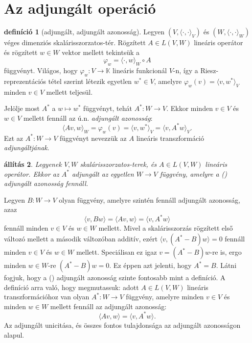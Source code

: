 \documentclass[9pt, a4paper, showtrims]{memoir}
\makeatletter
\renewenvironment{proof}[1][\proofname]
    {\par\pushQED{\qed}%
    \normalfont \topsep6\p@\@plus6\p@\relax
    \trivlist
    \item[\hskip\labelsep
        \itshape
    #1\@addpunct{:}]\ignorespaces}
    {\popQED\endtrivlist\@endpefalse}
\theoremstyle{plain}
\newtheorem{proposition}{állítás}[chapter]
\theoremstyle{remark}
\theoremstyle{definition}
\newtheorem{definition}[proposition]{definíció}
\newcommand{\ip}[2]{\langle#1,#2\rangle}
\makeatother
\begin{document}
\section{Az adjungált operáció}
\begin{definition}[adjungált, adjungált azonosság]
	Legyen $\left( V,\ip{\cdot}{\cdot}_V \right)$ és
	$\left( W,\ip{\cdot}{\cdot}_W \right)$ véges dimenziós ska\-láris\-szor\-zatos-tér.
	Rögzített $A\in L\left( V,W \right)$ lineáris operátor és rögzített $w\in W$ vektor mellett tekintsük a
	\[
		\varphi_w=
		\ip{\cdot}{w}_W\circ A
	\]
	függvényt.
	Világos, hogy $\varphi_w:V\to\mathbb{K}$ lineáris funkcionál $V$-n,
	így a Riesz-reprezentációs tétel szerint létezik egyetlen $w^\ast\in V$,
	amelyre
	$\varphi_w\left( v \right)=\ip{v}{w^\ast}_V$ minden $v\in V$ mellett teljesül.

	Jelölje most $A^\ast$ a $w\mapsto w^\ast$ függvényt, tehát
	$A^\ast:W\to V$.
	Ekkor minden $v\in V$ és $w\in V$ mellett fennáll az ú.n. \emph{adjungált azonosság}:
	\[
		\ip{Av}{w}_W
		=
		\varphi_w\left( v \right)
		=
		\ip{v}{w^\ast}_V
		=
		\ip{v}{A^\ast w}_V.\tag{\dag}
	\]
	Ezt az $A^\ast:W\to V$ függvényt nevezzük az $A$ lineáris transzformáció \emph{adjungáltjának}.
\end{definition}
\begin{proposition}
	Legyenek $V,W$ skalárisszorzatos-terek, és $A\in L\left( V,W \right)$ lineáris operátor.
	Ekkor az $A^\ast$ adjungált az egyetlen $W\to V$ függvény,
	amelyre a (\dag) adjungált azonosság fennáll.
\end{proposition}
\begin{proof}
	Legyen $B:W\to V$ olyan függvény, amelyre szintén fennáll adjungált azonosság,
	azaz
	\[
		\ip{v}{Bw}
		=
		\ip{Av}{w}
		=
		\ip{v}{A^\ast w}
	\]
	fennáll minden $v\in V$ és $w\in W$ mellett.
	Mivel a skalárisszorzás rögzített első változó mellett a második változóban additív,
	ezért
	$\ip{v}{\left( A^\ast-B \right)w}=0$ fennáll minden $v\in V$ és $w\in W$ mellett.
	Speciálisan ez igaz $v=\left( A^\ast-B \right)w$-re is, ergo minden $w\in W$-re
	$\left( A^\ast-B \right)w=0$.
	Ez éppen azt jelenti, hogy $A^\ast=B$.
\end{proof}
Látni fogjuk, hogy a (\dag) adjungált azonosság szinte fontosabb mint a definíció.
A definíció arra való, hogy megmutassuk: adott $A\in L\left( V,W \right)$ lineáris transzformációhoz van olyan
$A^\ast:W\to V$ függvény, amelyre minden $v\in V$ és minden $w\in W$ mellett fennáll az adjungált azonosság:
\[
	\ip{Av}{w}
	=
	\ip{v}{A^\ast w}.
	\tag{\dag}
\]
Az adjungált unicitása, és összes fontos tulajdonsága az adjungált azonosságon alapul.
\end{document}
